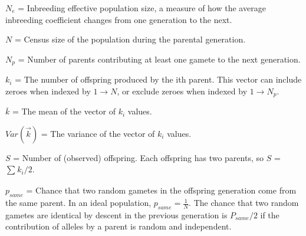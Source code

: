 \documentclass{article}
\begin{document}
\begin{description}

\item $N_e$ = Inbreeding effective population size, a measure of how the average inbreeding coefficient changes from one generation to the next.

\item $N$ = Census size of the population during the parental generation.

\item $N_p$ = Number of parents contributing at least one gamete to the next generation. 


\item $k_i$ = The number of offspring produced by the ith parent.  This vector can include zeroes when indexed by $1 \to N$, or exclude zeroes when indexed by $1 \to N_p$.

\item $\overline{k}$ = The mean of the vector of $k_i$ values.

\item $Var(\overrightarrow{k})$ = The variance of the vector of $k_i$ values. 

\item $S$ = Number of (observed) offspring. Each offspring has two parents, so $S$ = $\sum_{}^{} k_i / 2$.

\item $p_{same}$ = Chance that two random gametes in the offspring generation come from the same parent. In an ideal population, $p_{same} = \frac{1}{N}$.
The chance that two random gametes are identical by descent in the previous generation is $P_{same}/2$ if the contribution of alleles by a parent is random and independent.


\end{description}
\end{document}
